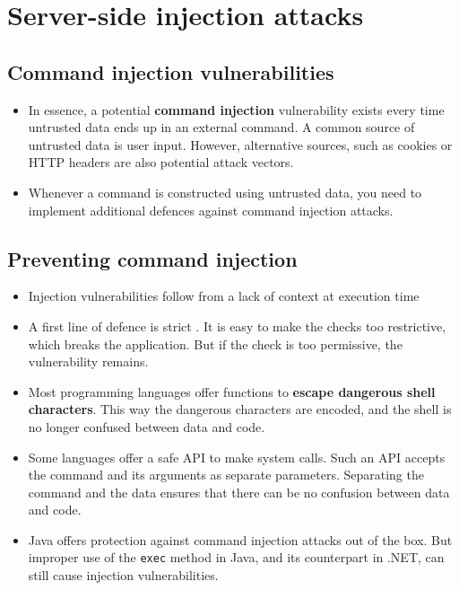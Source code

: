 \documentclass[../main.tex]{subfiles}
\begin{document}
\section{Server-side injection attacks }
\subsection{Command injection vulnerabilities}
\begin{itemize}
\item In essence, a potential \textbf{command injection} vulnerability exists every time untrusted data ends up in an external command. A common source of untrusted data is user input. However, alternative sources, such as cookies or HTTP headers are also potential attack vectors.
\item Whenever a command is constructed using untrusted data, you need to implement additional defences against command injection attacks.
\end{itemize}

\subsection{Preventing command injection}
\begin{itemize}
\item Injection vulnerabilities follow from a lack of context at execution time
\item A first line of defence is strict . It is easy to make the checks too restrictive, which breaks the application. But if the check is too permissive, the vulnerability remains.
\item Most programming languages offer functions to \textbf{escape dangerous shell characters}. This way the dangerous characters are encoded, and the shell is no longer confused between data and code.
\item Some languages offer a safe API to make system calls. Such an API accepts the command and its arguments as separate parameters. Separating the command and the data ensures that there can be no confusion between data and code.
\item Java offers protection against command injection attacks out of the box. But improper use of the \texttt{exec} method in Java, and its counterpart in .NET, can still cause injection vulnerabilities.
\end{itemize}
\end{document}
